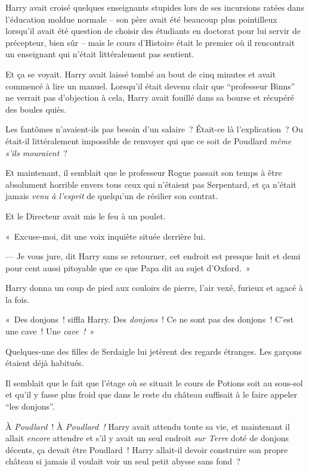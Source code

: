 Harry avait croisé quelques enseignants stupides lors de ses incursions ratées dans l'éducation moldue normale -- son père avait été beaucoup plus pointilleux lorsqu'il avait été question de choisir des étudiants en doctorat pour lui servir de précepteur, bien sûr -- mais le cours d'Histoire était le premier où il rencontrait un enseignant qui n'était littéralement pas sentient.

Et ça se voyait. Harry avait laissé tombé au bout de cinq minutes et avait commencé à lire un manuel. Lorsqu'il était devenu clair que “professeur Binns” ne verrait pas d'objection à cela, Harry avait fouillé dans sa bourse et récupéré des boules quiès.

Les fantômes n'avaient-ils pas besoin d'un salaire~? Était-ce là l'explication~? Ou était-il littéralement impossible de renvoyer qui que ce soit de Poudlard \emph{même s'ils mouraient}~?

Et maintenant, il semblait que le professeur Rogue passait son temps à être absolument horrible envers tous ceux qui n'étaient pas Serpentard, et ça n'était jamais \emph{venu à l'esprit} de quelqu'un de résilier son contrat.

Et le Directeur avait mis le feu à un poulet.

«~Excuse-moi, dit une voix inquiète située derrière lui.

--- Je vous jure, dit Harry sans se retourner, cet endroit est presque huit et demi pour cent aussi pitoyable que ce que Papa dit au sujet d'Oxford.~»

\later

Harry donna un coup de pied aux couloirs de pierre, l'air vexé, furieux et agacé à la fois.

«~Des donjons~! siffla Harry. Des \emph{donjons}~! Ce ne sont pas des donjons~! C'est une cave~! Une \emph{cave~!}~»

Quelques-une des filles de Serdaigle lui jetèrent des regards étranges. Les garçons étaient déjà habitués.

Il semblait que le fait que l'étage où se situait le cours de Potions soit au sous-sol et qu'il y fasse plus froid que dans le reste du château suffisait à le faire appeler “les donjons”.

À \emph{Poudlard}~! À \emph{Poudlard~!} Harry avait attendu toute sa vie, et maintenant il allait \emph{encore} attendre et s'il y avait un seul endroit \emph{sur Terre} doté de donjons décents, ça devait être Poudlard~! Harry allait-il devoir construire son propre château si jamais il voulait voir un seul petit abysse sans fond~?

